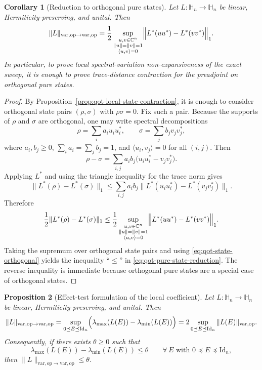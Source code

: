 \documentclass[11pt]{article}
\newcommand{\CC}{\mathbb{C}}
\newcommand{\Id}{\mathrm{Id}}
\newcommand{\Hh}{\mathbb{H}}
\newcommand{\op}{\mathrm{op}}
\newcommand{\varop}{\mathrm{var},\op}
\theoremstyle{plain}
\newtheorem{proposition}{Proposition}[section]
\newtheorem{corollary}[proposition]{Corollary}
\begin{document}
\begin{corollary}[Reduction to orthogonal pure states]
\label{cor:qot-pure-state-reduction}
Let $L:\Hh_n\to\Hh_n$ be linear, Hermiticity-preserving, and unital.
Then
\begin{equation}
\label{eq:qot-pure-state-reduction}
\|L\|_{\varop\to\varop}
=
\frac12
\sup_{\substack{u,v\in \CC^n\\ \|u\|=\|v\|=1\\ \langle u,v\rangle=0}}
\Bigl\|
L^\ast(uu^\ast)-L^\ast(vv^\ast)
\Bigr\|_1.
\end{equation}
In particular, to prove local spectral-variation non-expansiveness of the exact sweep, it is enough to prove trace-distance contraction for the preadjoint on orthogonal pure states.
\end{corollary}

\begin{proof}
By Proposition~\ref{prop:qot-local-state-contraction}, it is enough to consider orthogonal state pairs $(\rho,\sigma)$ with $\rho\sigma=0$.
Fix such a pair.
Because the supports of $\rho$ and $\sigma$ are orthogonal, one may write spectral decompositions
\[
\rho=\sum_i a_i u_i u_i^\ast,
\qquad
\sigma=\sum_j b_j v_j v_j^\ast,
\]
where $a_i,b_j\ge 0$, $\sum_i a_i=\sum_j b_j=1$, and $\langle u_i,v_j\rangle=0$ for all $(i,j)$.
Then
\[
\rho-\sigma
=
\sum_{i,j} a_i b_j \bigl(u_i u_i^\ast-v_j v_j^\ast\bigr).
\]
Applying $L^\ast$ and using the triangle inequality for the trace norm gives
\[
\|L^\ast(\rho)-L^\ast(\sigma)\|_1
\le
\sum_{i,j} a_i b_j
\bigl\|
L^\ast(u_i u_i^\ast)-L^\ast(v_j v_j^\ast)
\bigr\|_1.
\]
Therefore
\[
\frac12\|L^\ast(\rho)-L^\ast(\sigma)\|_1
\le
\frac12
\sup_{\substack{u,v\in \CC^n\\ \|u\|=\|v\|=1\\ \langle u,v\rangle=0}}
\Bigl\|
L^\ast(uu^\ast)-L^\ast(vv^\ast)
\Bigr\|_1.
\]
Taking the supremum over orthogonal state pairs and using \eqref{eq:qot-state-orthogonal} yields the inequality ``$\le$'' in \eqref{eq:qot-pure-state-reduction}.
The reverse inequality is immediate because orthogonal pure states are a special case of orthogonal states.
\end{proof}

\begin{proposition}[Effect-test formulation of the local coefficient]
\label{prop:qot-effect-test}
Let $L:\Hh_n\to\Hh_n$ be linear, Hermiticity-preserving, and unital.
Then
\begin{equation}
\label{eq:qot-effect-test}
\|L\|_{\varop\to\varop}
=
\sup_{0\preceq E\preceq \Id_n}
\Bigl(\lambda_{\max}(L(E))-\lambda_{\min}(L(E))\Bigr)
=
2\sup_{0\preceq E\preceq \Id_n}\|L(E)\|_{\varop}.
\end{equation}
Consequently, if there exists $\theta\ge 0$ such that
\begin{equation}
\label{eq:qot-effect-band}
\lambda_{\max}(L(E))-\lambda_{\min}(L(E))
\le \theta
\qquad
\forall\, E \text{ with } 0\preceq E\preceq \Id_n,
\end{equation}
then $\|L\|_{\varop\to\varop}\le \theta$.
\end{proposition}
\end{document}
